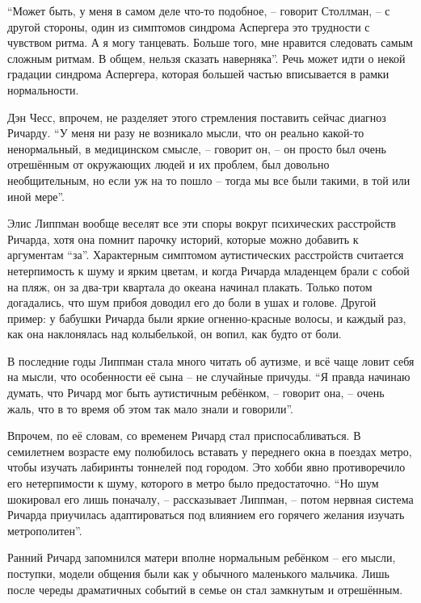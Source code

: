 \enquote{Может быть, у меня в самом деле что-то подобное, -- говорит Столлман, -- с другой стороны, один из симптомов синдрома Аспергера это трудности с чувством ритма. А я могу танцевать. Больше того, мне нравится следовать самым сложным ритмам. В общем, нельзя сказать наверняка}. Речь может идти о некой градации синдрома Аспергера, которая большей частью вписывается в рамки нормальности. 

Дэн Чесс, впрочем, не разделяет этого стремления поставить сейчас диагноз Ричарду. \enquote{У меня ни разу не возникало мысли, что он реально какой-то ненормальный, в медицинском смысле, -- говорит он, -- он просто был очень отрешённым от окружающих людей и их проблем, был довольно необщительным, но если уж на то пошло -- тогда мы все были такими, в той или иной мере}.

Элис Липпман вообще веселят все эти споры вокруг психических расстройств Ричарда, хотя она помнит парочку историй, которые можно добавить к аргументам \enquote{за}. Характерным симптомом аутистических расстройств считается нетерпимость к шуму и ярким цветам, и когда Ричарда младенцем брали с собой на пляж, он за два-три квартала до океана начинал плакать. Только потом догадались, что шум прибоя доводил его до боли в ушах и голове. Другой пример: у бабушки Ричарда были яркие огненно-красные волосы, и каждый раз, как она наклонялась над колыбелькой, он вопил, как будто от боли.

В последние годы Липпман стала много читать об аутизме, и всё чаще ловит себя на мысли, что особенности её сына -- не случайные причуды. \enquote{Я правда начинаю думать, что Ричард мог быть аутистичным ребёнком, -- говорит она, -- очень жаль, что в то время об этом так мало знали и говорили}.

Впрочем, по её словам, со временем Ричард стал приспосабливаться. В семилетнем возрасте ему полюбилось вставать у переднего окна в поездах метро, чтобы изучать лабиринты тоннелей под городом. Это хобби явно противоречило его нетерпимости к шуму, которого в метро было предостаточно. \enquote{Но шум шокировал его лишь поначалу, -- рассказывает Липпман, -- потом нервная система Ричарда приучилась адаптироваться под влиянием его горячего желания изучать метрополитен}.

Ранний Ричард запомнился матери вполне нормальным ребёнком -- его мысли, поступки, модели общения были как у обычного маленького мальчика. Лишь после череды драматичных событий в семье он стал замкнутым и отрешённым.

